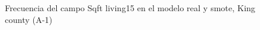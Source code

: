 \begin{figure}[H]
    \centering
    
    \caption{Frecuencia del campo Sqft living15 en el modelo real y smote, King county (A-1)}
    \label{frecuency-smote-sqft living15}
\end{figure}